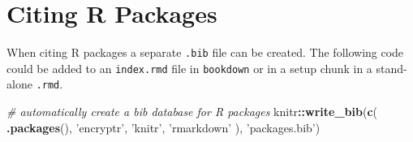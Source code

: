 \documentclass[
]{book}
\newenvironment{Shaded}{\begin{snugshade}}{\end{snugshade}}
\newcommand{\CommentTok}[1]{\textcolor[rgb]{0.56,0.35,0.01}{\textit{#1}}}
\newcommand{\KeywordTok}[1]{\textcolor[rgb]{0.13,0.29,0.53}{\textbf{#1}}}
\newcommand{\NormalTok}[1]{#1}
\newcommand{\OperatorTok}[1]{\textcolor[rgb]{0.81,0.36,0.00}{\textbf{#1}}}
\newcommand{\StringTok}[1]{\textcolor[rgb]{0.31,0.60,0.02}{#1}}
\begin{document}
\hypertarget{citing-r-packages}{%
\section{Citing R Packages}\label{citing-r-packages}}

When citing R packages a separate \texttt{.bib} file can be created. The following code could be added to an \texttt{index.rmd} file in \texttt{bookdown} or in a setup chunk in a stand-alone \texttt{.rmd}.

\begin{Shaded}
\begin{Highlighting}[]
\CommentTok{# automatically create a bib database for R packages}
\NormalTok{knitr}\OperatorTok{::}\KeywordTok{write_bib}\NormalTok{(}\KeywordTok{c}\NormalTok{(}
  \KeywordTok{.packages}\NormalTok{(), }\StringTok{'encryptr'}\NormalTok{, }\StringTok{'knitr'}\NormalTok{, }\StringTok{'rmarkdown'}
\NormalTok{), }\StringTok{'packages.bib'}\NormalTok{)}
\end{Highlighting}
\end{Shaded}

  
\end{document}
